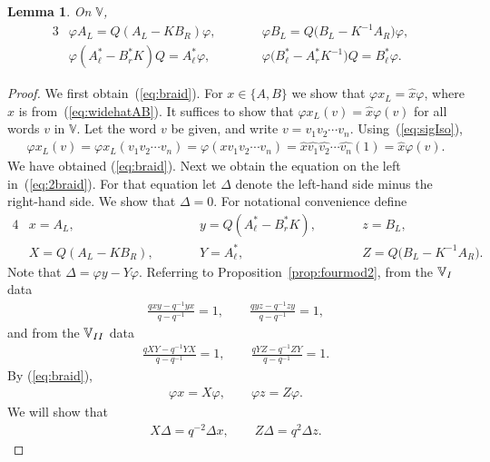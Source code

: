 \documentclass[11pt]{article}
\numberwithin{equation}{section}
\numberwithin{equation}{section}
\newtheorem{Lemma}[Theorem]{Lemma}
\begin{document}
{\begin{Lemma}\label{lem:braid}On $\mathbb V$,
\begin{alignat}{3}
&\varphi A_L = Q(A_L-K B_R) \varphi, \qquad && \varphi B_L = Q\big(B_L-K^{-1} A_R\big) \varphi,& \label{eq:braid}\\
& \varphi (A^*_\ell-B^*_r K)Q = A^*_\ell \varphi, \qquad&& \varphi \big(B^*_\ell-A^*_r K^{-1}\big)Q = B^*_\ell \varphi.& \label{eq:2braid}
\end{alignat}
\end{Lemma}
\begin{proof} We first obtain~(\ref{eq:braid}). For $x \in \lbrace A, B\rbrace$ we show that $\varphi x_L = \widehat x \varphi$, where $\widehat x$ is from~(\ref{eq:widehatAB}). It suffices to show that $\varphi x_L (v) = \widehat x \varphi (v)$ for all words $v$ in $\mathbb V$. Let the word $v$ be given, and write $v=v_1v_2\cdots v_n$. Using~(\ref{eq:sigIso}),
\begin{gather*}
\varphi x_L (v) =\varphi x_L (v_1v_2\cdots v_n)=\varphi (x v_1v_2\cdots v_n)
= \widehat x \widehat{v_1} \widehat{v_2}\cdots \widehat{v_n}(1)= \widehat x \varphi (v).
\end{gather*}
We have obtained (\ref{eq:braid}). Next we obtain the equation on the left in~(\ref{eq:2braid}).
For that equation let $\Delta$ denote the left-hand side minus the right-hand side. We show that $\Delta=0$.
For notational convenience define
\begin{alignat*}{4}
&x = A_L, \qquad && y= Q(A^*_{\ell}-B^*_r K), \qquad && z= B_L,& \\
&X= Q(A_L-KB_R), \qquad && Y=A^*_\ell, \qquad && Z= Q\big(B_L-K^{-1} A_R\big).
\end{alignat*}
Note that $\Delta = \varphi y - Y \varphi$. Referring to Proposition~\ref{prop:fourmod2}, from the $\mathbb V_{\rm I}$ data
\begin{gather*}
\frac{qxy-q^{-1}yx}{q-q^{-1}}=1, \qquad \frac{qyz-q^{-1}zy}{q-q^{-1}}=1,
\end{gather*}
and from the $\mathbb V_{\rm II}$ data
\begin{gather*}
\frac{qXY-q^{-1}YX}{q-q^{-1}}=1, \qquad \frac{qYZ-q^{-1}ZY}{q-q^{-1}}=1.
\end{gather*}
By (\ref{eq:braid}),
\begin{gather*}
\varphi x = X \varphi, \qquad \varphi z = Z \varphi.
\end{gather*}
We will show that
\begin{gather}
X\Delta = q^{-2} \Delta x, \qquad Z\Delta = q^2 \Delta z.

\end{gather}
\end{proof}}
\end{document}

